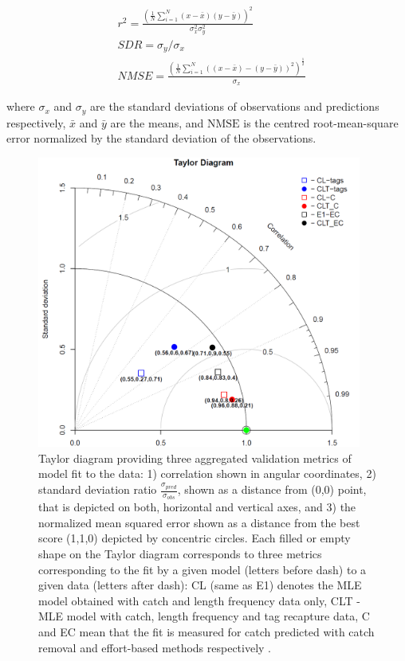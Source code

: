 \begin{align}
& r^2 = \frac{\left(\frac{1}{N}\sum\limits_{i=1}^N{ (x-\bar{x})(y-\bar{y})}\right)^2}{\sigma^2_x \sigma^2_y} \label{eq:r2} \\
& SDR = \sigma_y/\sigma_x\\
& NMSE = \frac{\left(\frac{1}{N}\sum\limits_{i=1}^N \left((x-\bar{x})-(y-\bar{y})\right)^2\right)^{\frac{1}{2}}}{\sigma_x}\label{eq:nmse}
\end{align} 

\noindent where $\sigma_x$ and $\sigma_y$ are the standard deviations of observations and predictions respectively, $\bar{x}$ and $\bar{y}$ are the means, and $\text{NMSE}$ is the centred root-mean-square error normalized by the standard deviation of the observations.

\begin{figure}[H]
	\centering
	    \vspace{1cm}
		\includegraphics[width=0.95\textwidth]{chapter4/figs/taylor}
		\vspace{0.5cm}
	\caption{Taylor diagram providing three aggregated validation metrics of model fit to the 
data: 1) correlation shown in angular coordinates, 2) standard deviation ratio $\frac{\sigma_{pred}}{\sigma_{obs}}$, shown as a distance from (0,0) point, that is depicted on both, horizontal and vertical axes, and 3) the normalized mean squared error shown as a distance from the best score (1,1,0) depicted by concentric circles. Each filled or empty shape on the Taylor diagram corresponds to three metrics corresponding to the fit by a given model (letters before dash) to a given data (letters after dash): CL (same as E1) denotes the MLE model obtained with catch and length frequency data only, CLT - MLE model with catch, length frequency and tag recapture data, C and EC mean that the fit is measured for catch predicted with catch removal and effort-based methods respectively \citep*[From][]{Senina20b}.}
	\label{fig:taylor}
\end{figure}

